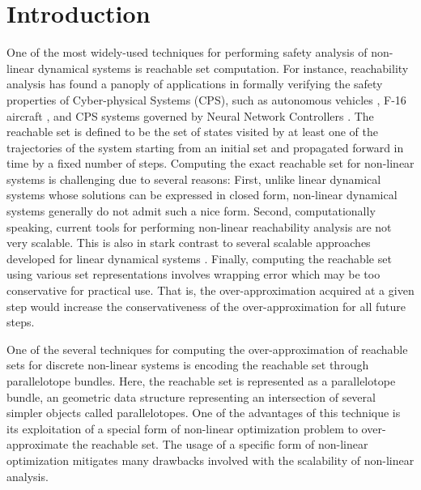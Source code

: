 \chapter{Introduction}
\label{sec:intro}

One of the most widely-used techniques for performing safety analysis of non-linear dynamical systems is reachable set computation.
%
For instance, reachability analysis has found a panoply of applications in formally verifying the safety properties of Cyber-physical Systems (CPS), such as autonomous vehicles \cite{althoff2010reachability}, F-16 aircraft \cite{heidlauf2018verification}, and CPS systems governed by Neural Network Controllers \cite{tran2019star, fan2020reachnn, bak2021nnenum}.
%
The reachable set is defined to be the set of states visited by at least one of the trajectories of the system starting from an initial set and propagated forward in time by a fixed number of steps.
%
Computing the exact reachable set for non-linear systems is challenging due to several reasons:
%
First, unlike linear dynamical systems whose solutions can be expressed in closed form, non-linear dynamical systems generally do not admit such a nice form.
%
Second, computationally speaking, current tools for performing non-linear reachability analysis are not very scalable. This is also in stark contrast to several scalable approaches developed for linear dynamical systems \cite{duggirala2016parsimonious, bak2017simulation}.
%
Finally, computing the reachable set using various set representations involves wrapping error which may be too conservative for practical use.
%
That is, the over-approximation acquired at a given step would increase the conservativeness of the over-approximation for all future steps.

One of the several techniques for computing the over-approximation of reachable sets for discrete non-linear systems is encoding the reachable set through parallelotope bundles.
%
Here, the reachable set is represented as a parallelotope bundle, an geometric data structure representing an intersection of several simpler objects called parallelotopes.
%
One of the advantages of this technique is its exploitation of a special form of non-linear optimization problem to over-approximate the reachable set.
%
The usage of a specific form of non-linear optimization mitigates many drawbacks involved with the scalability of non-linear analysis.

